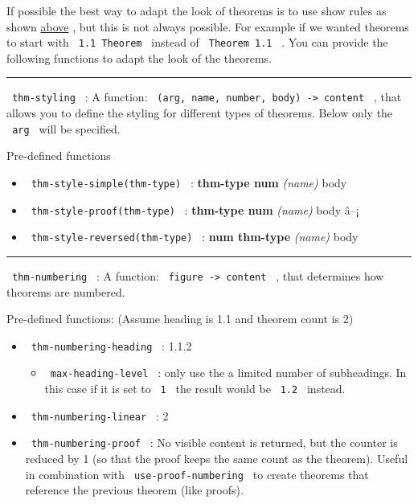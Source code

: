 If possible the best way to adapt the look of theorems is to use show
rules as shown
\href{https://github.com/typst/packages/raw/main/packages/preview/lemmify/0.1.6/\#basic-usage}{above}
, but this is not always possible. For example if we wanted theorems to
start with \texttt{\ 1.1\ Theorem\ } instead of
\texttt{\ Theorem\ 1.1\ } . You can provide the following functions to
adapt the look of the theorems.

\begin{center}\rule{0.5\linewidth}{0.5pt}\end{center}

\texttt{\ thm-styling\ } : A function:
\texttt{\ (arg,\ name,\ number,\ body)\ -\textgreater{}\ content\ } ,
that allows you to define the styling for different types of theorems.
Below only the \texttt{\ arg\ } will be specified.

Pre-defined functions

\begin{itemize}
\tightlist
\item
  \texttt{\ thm-style-simple(thm-type)\ } : \textbf{thm-type num}
  \emph{(name)} body
\item
  \texttt{\ thm-style-proof(thm-type)\ } : \textbf{thm-type num}
  \emph{(name)} body â--¡
\item
  \texttt{\ thm-style-reversed(thm-type)\ } : \textbf{num thm-type}
  \emph{(name)} body
\end{itemize}

\begin{center}\rule{0.5\linewidth}{0.5pt}\end{center}

\texttt{\ thm-numbering\ } : A function:
\texttt{\ figure\ -\textgreater{}\ content\ } , that determines how
theorems are numbered.

Pre-defined functions: (Assume heading is 1.1 and theorem count is 2)

\begin{itemize}
\tightlist
\item
  \texttt{\ thm-numbering-heading\ } : 1.1.2

  \begin{itemize}
  \tightlist
  \item
    \texttt{\ max-heading-level\ } : only use the a limited number of
    subheadings. In this case if it is set to \texttt{\ 1\ } the result
    would be \texttt{\ 1.2\ } instead.
  \end{itemize}
\item
  \texttt{\ thm-numbering-linear\ } : 2
\item
  \texttt{\ thm-numbering-proof\ } : No visible content is returned, but
  the counter is reduced by 1 (so that the proof keeps the same count as
  the theorem). Useful in combination with
  \texttt{\ use-proof-numbering\ } to create theorems that reference the
  previous theorem (like proofs).
\end{itemize}

